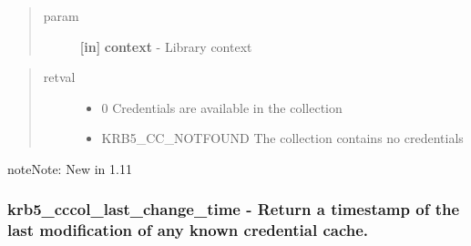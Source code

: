 \documentclass[letterpaper,10pt,english]{sphinxmanual}
\begin{document}
\begin{quote}\begin{description}
\item[{param}] \leavevmode
\textbf{{[}in{]}} \textbf{context} - Library context

\end{description}\end{quote}
\begin{quote}\begin{description}
\item[{retval}] \leavevmode\begin{itemize}
\item {} 
0   Credentials are available in the collection

\item {} 
KRB5\_CC\_NOTFOUND   The collection contains no credentials

\end{itemize}

\end{description}\end{quote}

\begin{notice}{note}{Note:}
New in 1.11
\end{notice}


\subsubsection{krb5\_cccol\_last\_change\_time -  Return a timestamp of the last modification of any known credential cache.}
\label{appdev/refs/api/krb5_cccol_last_change_time:krb5-cccol-last-change-time-return-a-timestamp-of-the-last-modification-of-any-known-credential-cache}\label{appdev/refs/api/krb5_cccol_last_change_time::doc}

\begin{fulllineitems}
\label{appdev/refs/api/krb5_cccol_last_change_time:krb5_cccol_last_change_time}
\end{fulllineitems}
\end{document}
